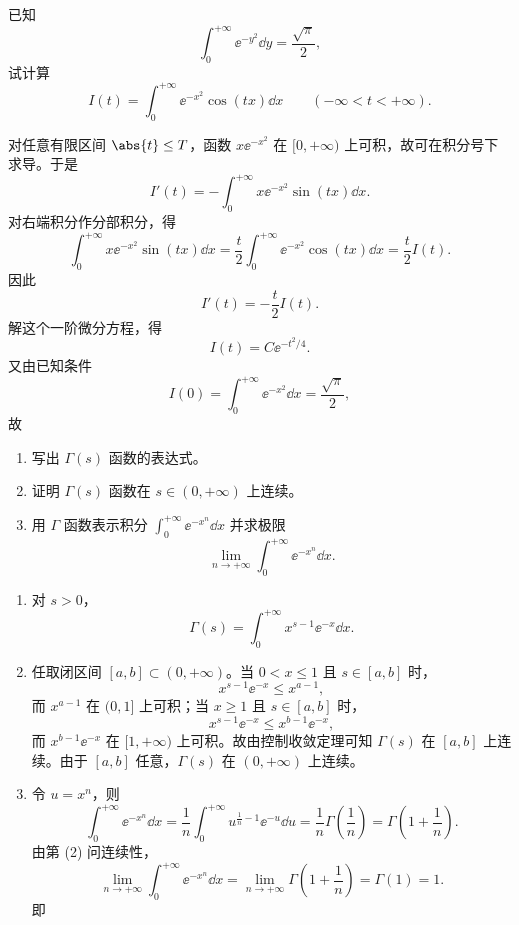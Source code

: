 \begin{question}[含参积分]

已知
\[
\int_0^{+\infty}\ee^{-y^2}\dd{y}=\frac{\sqrt\pi}{2},
\]
试计算
\[
I(t)=\int_0^{+\infty}\ee^{-x^2}\cos(tx)\dd{x}\qquad (-\infty<t<+\infty).
\]

\begin{solution}

对任意有限区间 $\abs{t}\le T$，函数 $x\ee^{-x^2}$ 在 $[0,+\infty)$ 上可积，故可在积分号下求导。于是
\[
I'(t)=-\int_0^{+\infty}x\ee^{-x^2}\sin(tx)\dd{x}.
\]
对右端积分作分部积分，得
\[
\int_0^{+\infty}x\ee^{-x^2}\sin(tx)\dd{x}
=\frac{t}{2}\int_0^{+\infty}\ee^{-x^2}\cos(tx)\dd{x}
=\frac{t}{2}I(t).
\]
因此
\[
I'(t)=-\frac{t}{2}I(t).
\]
解这个一阶微分方程，得
\[
I(t)=C\ee^{-t^2/4}.
\]
又由已知条件
\[
I(0)=\int_0^{+\infty}\ee^{-x^2}\dd{x}=\frac{\sqrt\pi}{2},
\]
故

\end{solution}
\end{question}

\begin{question}[$\Gamma$ 函数]

\begin{enumerate}
\item 写出 $\Gamma(s)$ 函数的表达式。
\item 证明 $\Gamma(s)$ 函数在 $s\in(0,+\infty)$ 上连续。
\item 用 $\Gamma$ 函数表示积分 $\displaystyle \int_0^{+\infty}\ee^{-x^n}\dd{x}$ 并求极限
\[
\lim_{n\to+\infty}\int_0^{+\infty}\ee^{-x^n}\dd{x}.
\]
\end{enumerate}

\begin{solution}

\begin{enumerate}
\item 对 $s>0$，
\[
\Gamma(s)=\int_0^{+\infty}x^{s-1}\ee^{-x}\dd{x}.
\]

\item 任取闭区间 $[a,b]\subset(0,+\infty)$。当 $0<x\le1$ 且 $s\in[a,b]$ 时，
\[
x^{s-1}\ee^{-x}\le x^{a-1},
\]
而 $x^{a-1}$ 在 $(0,1]$ 上可积；当 $x\ge1$ 且 $s\in[a,b]$ 时，
\[
x^{s-1}\ee^{-x}\le x^{b-1}\ee^{-x},
\]
而 $x^{b-1}\ee^{-x}$ 在 $[1,+\infty)$ 上可积。故由控制收敛定理可知 $\Gamma(s)$ 在 $[a,b]$ 上连续。由于 $[a,b]$ 任意，$\Gamma(s)$ 在 $(0,+\infty)$ 上连续。

\item 令 $u=x^n$，则
\[
\int_0^{+\infty}\ee^{-x^n}\dd{x}
=\frac1n\int_0^{+\infty}u^{\frac1n-1}\ee^{-u}\dd{u}
=\frac1n\Gamma\!\left(\frac1n\right)
=\Gamma\!\left(1+\frac1n\right).
\]
由第 (2) 问连续性，
\[
\lim_{n\to+\infty}\int_0^{+\infty}\ee^{-x^n}\dd{x}
=\lim_{n\to+\infty}\Gamma\!\left(1+\frac1n\right)
=\Gamma(1)=1.
\]
即
\end{enumerate}

\end{solution}
\end{question}

